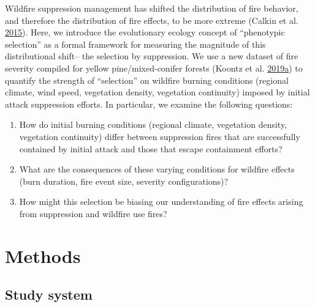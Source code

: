 \documentclass[twoside,12pt,final]{ucthesis-CA2012}
\begin{document}
\begin{ucmainmatter}
Wildfire suppression management has shifted the distribution of fire
behavior, and therefore the distribution of fire effects, to be more
extreme (Calkin et al. \protect\hyperlink{ref-calkin2015}{2015}). Here,
we introduce the evolutionary ecology concept of ``phenotypic
selection'' as a formal framework for measuring the magnitude of this
distributional shift-- the selection by suppression. We use a new
dataset of fire severity compiled for yellow pine/mixed-conifer forests
(Koontz et al.
\protect\hyperlink{ref-koontz2019}{2019}\protect\hyperlink{ref-koontz2019}{a})
to quantify the strength of ``selection'' on wildfire burning conditions
(regional climate, wind speed, vegetation density, vegetation
continuity) imposed by initial attack suppression efforts. In
particular, we examine the following questions:
\begin{enumerate}
\def\labelenumi{\arabic{enumi}.}
\item
  How do initial burning conditions (regional climate, vegetation
  density, vegetation continuity) differ between suppression fires that
  are successfully contained by initial attack and those that escape
  containment efforts?
\item
  What are the consequences of these varying conditions for wildfire
  effects (burn duration, fire event size, severity configurations)?
\item
  How might this selection be biasing our understanding of fire effects
  arising from suppression and wildfire use fires?
\end{enumerate}
\section{Methods}\label{methods-1}

\subsection{Study system}\label{study-system-2}


\end{ucmainmatter}
\end{document}
